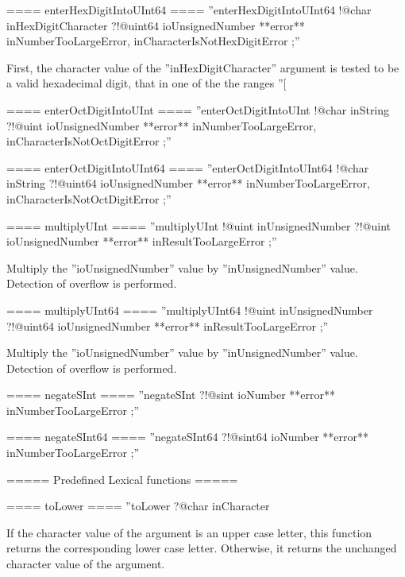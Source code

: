 ==== enterHexDigitIntoUInt64 ====
''enterHexDigitIntoUInt64 !@char inHexDigitCharacter ?!@uint64 ioUnsignedNumber **error** inNumberTooLargeError, inCharacterIsNotHexDigitError ;''

First, the character value of the ''inHexDigitCharacter'' argument is tested to be a valid hexadecimal digit, that in one of the the ranges ''[%

==== enterOctDigitIntoUInt ====
''enterOctDigitIntoUInt !@char inString ?!@uint ioUnsignedNumber **error** inNumberTooLargeError, inCharacterIsNotOctDigitError ;''

==== enterOctDigitIntoUInt64 ====
''enterOctDigitIntoUInt64 !@char inString ?!@uint64 ioUnsignedNumber **error** inNumberTooLargeError, inCharacterIsNotOctDigitError ;''

==== multiplyUInt ====
''multiplyUInt !@uint inUnsignedNumber ?!@uint ioUnsignedNumber **error** inResultTooLargeError ;''

Multiply the ''ioUnsignedNumber'' value by ''inUnsignedNumber'' value. Detection of overflow is performed.

==== multiplyUInt64 ====
''multiplyUInt64 !@uint inUnsignedNumber ?!@uint64 ioUnsignedNumber **error** inResultTooLargeError ;''

Multiply the ''ioUnsignedNumber'' value by ''inUnsignedNumber'' value. Detection of overflow is performed.

==== negateSInt ====
''negateSInt ?!@sint ioNumber **error** inNumberTooLargeError ;''

==== negateSInt64 ====
''negateSInt64 ?!@sint64 ioNumber **error** inNumberTooLargeError ;''

===== Predefined Lexical functions =====

==== toLower ====
''toLower ?@char inCharacter %

If the character value of the argument is an upper case letter, this function returns the corresponding lower case letter. Otherwise, it returns the unchanged character value of the argument.


